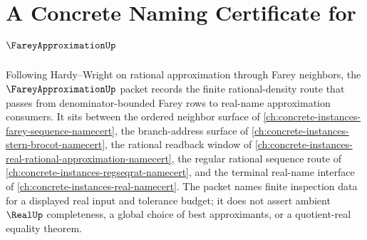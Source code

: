 \chapter{A Concrete Naming Certificate for $\FareyApproximationUp$}
\label{ch:concrete-instances-farey-approximation-namecert}

Following Hardy--Wright on rational approximation through Farey neighbors, the $\FareyApproximationUp$ packet records the finite rational-density route that passes from denominator-bounded Farey rows to real-name approximation consumers. It sits between the ordered neighbor surface of \autoref{ch:concrete-instances-farey-sequence-namecert}, the branch-address surface of \autoref{ch:concrete-instances-stern-brocot-namecert}, the rational readback window of \autoref{ch:concrete-instances-real-rational-approximation-namecert}, the regular rational sequence route of \autoref{ch:concrete-instances-regseqrat-namecert}, and the terminal real-name interface of \autoref{ch:concrete-instances-real-namecert}. The packet names finite inspection data for a displayed real input and tolerance budget; it does not assert ambient $\RealUp$ completeness, a global choice of best approximants, or a quotient-real equality theorem.

